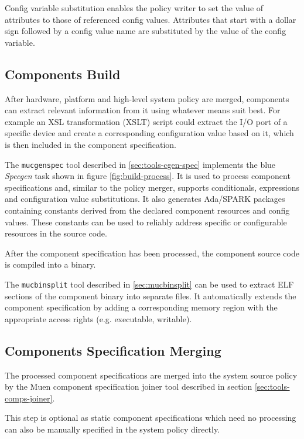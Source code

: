 \documentclass[a4paper,twoside,titlepage]{article}
\begin{document}
Config variable substitution enables the policy writer to set the value of
attributes to those of referenced config values. Attributes that start with a
dollar sign followed by a config value name are substituted by the value of the
config variable.

\subsection{Components Build}
\label{sec:build-components}
After hardware, platform and high-level system policy are merged, components
can extract relevant information from it using whatever means suit best. For
example an XSL transformation (XSLT) script could extract the I/O port of a
specific device and create a corresponding configuration value based on it,
which is then included in the component specification.

The \texttt{mucgenspec} tool described in \ref{sec:tools-cgen-spec} implements
the blue \emph{Specgen} task shown in figure \ref{fig:build-process}. It is
used to process component specifications and, similar to the policy merger,
supports conditionals, expressions and configuration value substitutions. It
also generates Ada/SPARK packages containing constants derived from the
declared component resources and config values. These constants can be used to
reliably address specific or configurable resources in the source code.

After the component specification has been processed, the component source code
is compiled into a binary.

The \texttt{mucbinsplit} tool described in \ref{sec:mucbinsplit} can be used to
extract ELF sections of the component binary into separate files. It
automatically extends the component specification by adding a corresponding
memory region with the appropriate access rights (e.g. executable, writable).

\subsection{Components Specification Merging}
\label{sec:build-compspec-merging}
The processed component specifications are merged into the system source
policy by the Muen component specification joiner tool described in section
\ref{sec:tools-comps-joiner}.

This step is optional as static component specifications which need no
processing can also be manually specified in the system policy directly.
\end{document}
